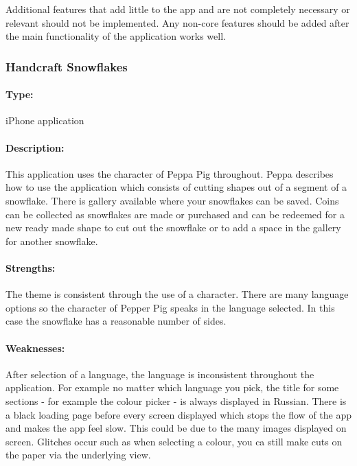 \documentclass[11pt]{article}
\begin{document}
                Additional features that add little to the app and are not completely necessary or relevant should not be implemented. Any non-core features should be added after the main functionality of the application works well.
                
                
                 \subsubsection{Handcraft Snowflakes}
            
                \paragraph{Type:} iPhone application 

                \paragraph{Description:}
                This application uses the character of Peppa Pig throughout. Peppa describes how to use the application which consists of cutting shapes out of a segment of a snowflake. There is gallery available where your snowflakes can be saved. Coins can be collected as snowflakes are made or purchased and can be redeemed for a new ready made shape to cut out the snowflake or to add a space in the gallery for another snowflake. 

                \paragraph{Strengths:}
                The theme is consistent through the use of a character.
                There are many language options so the character of Pepper Pig speaks in the language selected.
                In this case the snowflake has a reasonable number of sides. 

                \paragraph{Weaknesses:}
                After selection of a language, the language is inconsistent throughout the application. For example no matter which language you pick, the title for some sections - for example the colour picker - is always displayed in Russian. There is a black loading page before every screen displayed which stops the flow of the app and makes the app feel slow. This could be due to the many images displayed on screen. Glitches occur such as when selecting a colour, you ca still make cuts on the paper via the underlying view. 
                
\end{document}
